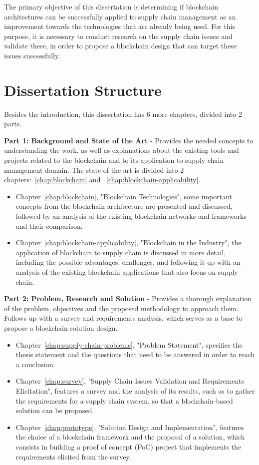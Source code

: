 The primary objective of this dissertation is determining if blockchain architectures can be successfully applied to supply chain management as an improvement towards the technologies that are already being used. For this purpose, it is necessary to conduct research on the supply chain issues and validate these, in order to propose a blockchain design that can target these issues successfully. 

\section{Dissertation Structure} \label{sec:struct}

Besides the introduction, this dissertation has 6 more chapters, divided into 2 parts.

\par \textbf{Part 1: Background and State of the Art} - Provides the needed concepts to understanding the work, as well as explanations about the existing tools and projects related to the blockchain and to its application to supply chain management domain.
 The state of the art is divided into 2 chapters:~\ref{chap:blockchain} and ~\ref{chap:blockchain-applicability}.
\begin{itemize}
  \item Chapter~\ref{chap:blockchain}, "Blockchain Technologies", some important concepts from the blockchain architecture are presented and discussed, followed by an analysis of the existing blockchain networks and frameworks and their comparison.
  \item Chapter~\ref{chap:blockchain-applicability}, "Blockchain in the Industry", the application of blockchain to supply chain is discussed in more detail, including the possible advantages, challenges, and following it up with an analysis of the existing blockchain applications that also focus on supply chain. 
\end{itemize}

\par \textbf{Part 2: Problem, Research and Solution} - Provides a thorough explanation of the problem, objectives and the proposed methodology to approach them. Follows up with a survey and requirements analysis, which serves as a base to propose a blockchain solution design. 
\begin{itemize}
  \item Chapter~\ref{chap:supply-chain-problems}, "Problem Statement", specifies the thesis statement and the questions that need to be answered in order to reach a conclusion.
  \item Chapter~\ref{chap:survey}, "Supply Chain Issues Validation and Requirements Elicitation", features a survey and the analysis of its results, such as to gather the requirements for a supply chain system, so that a blockchain-based solution can be proposed.
  \item Chapter~\ref{chap:prototype}, "Solution Design and Implementation", features the choice of a blockchain framework and the proposal of a solution, which consists in building a proof of concept (PoC) project that implements the requirements elicited from the survey.
\end{itemize}

